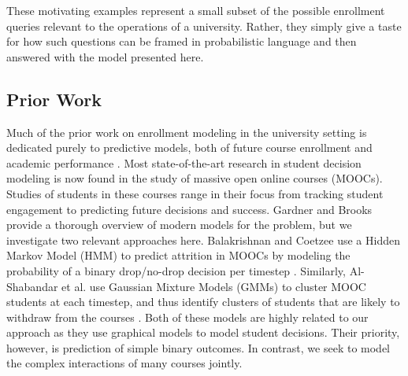 \documentclass{edm_template}
\begin{document}
These motivating examples represent a small subset of the possible enrollment queries relevant to the operations of a university. Rather, they simply give a taste for how such questions can be framed in probabilistic language and then answered with the model presented here. 

\subsection{Prior Work}
\label{section:related-work}

Much of the prior work on enrollment modeling in the university setting is dedicated purely to predictive models, both of future course enrollment \cite{kardan2013prediction}\cite{nandeshwar2009enrollment}\cite{song1993new} and academic performance \cite{kovacic2010early}\cite{hlosta2017ouroboros}. 
Most state-of-the-art research in student decision modeling is now found in the study of massive open online courses (MOOCs). Studies of students in these courses range in their focus from tracking student engagement to predicting future decisions and success. Gardner and Brooks \cite{Gardner2018StudentSP} provide a thorough overview of modern models for the problem, but we investigate two relevant approaches here. Balakrishnan and Coetzee use a Hidden Markov Model (HMM) to predict attrition in MOOCs by modeling the probability of a binary drop/no-drop decision per timestep \cite{balakrishnan2013predicting}. Similarly, Al-Shabandar et al. use Gaussian Mixture Models (GMMs) to cluster MOOC students at each timestep, and thus identify clusters of students that are likely to withdraw from the courses  \cite{AlShabandar2018TheAO}. Both of these models are highly related to our approach as they use graphical models to model student decisions. Their priority, however, is prediction of simple binary outcomes. In contrast, we seek to model the complex interactions of many courses jointly.
\end{document}
